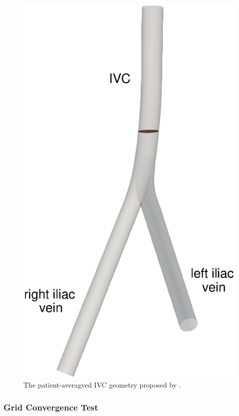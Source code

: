 \begin{figure}[htbp]
    \centering
    \includegraphics[scale=0.3]{imgs/vena_cava/venacava_plot.eps}
    \caption{The patient-averagved IVC geometry proposed by \cite{gallagher_exp}.}
    \label{fig:IVCgeo}
\end{figure}

\subsubsection*{Grid Convergence Test}

